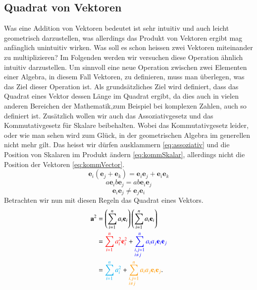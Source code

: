 \subsection{Quadrat von Vektoren}
Was eine Addition von Vektoren bedeutet ist sehr intuitiv und auch leicht geometrisch darzustellen, was allerdings das Produkt von Vektoren ergibt mag anfänglich unintuitiv wirken. 
Was soll es schon heissen zwei Vektoren miteinander zu multiplizieren? 
\newline
Im Folgenden werden wir versuchen diese Operation ähnlich intuitiv darzustellen.
\newline
Um sinnvoll eine neue Operation zwischen zwei Elementen einer Algebra, in diesem Fall Vektoren, zu definieren, muss man überlegen, was das Ziel dieser Operation ist. 
Als grundsätzliches Ziel wird definiert, dass das Quadrat eines Vektor dessen Länge im Quadrat ergibt, da dies auch in vielen anderen Bereichen der Mathematik,zum Beispiel bei komplexen Zahlen, auch so definiert ist.  
\newline 
Zusätzlich wollen wir auch das Assoziativgesetz und das Kommutativgesetz für Skalare beibehalten. Wobei das Kommutativgesetz leider, oder wie man sehen wird zum Glück, in der geometrischen Algebra im generellen nicht mehr gilt. Das heisst wir dürfen ausklammern \ref{eq:assoziativ} und die Position von Skalaren im Produkt ändern \ref{eq:kommSkalar}, allerdings nicht die Position der Vektoren \ref{eq:kommVector}.
\begin{equation}
    \label{eq:assoziativ}
    \textbf{e}_i(\textbf{e}_j + \textbf{e}_k) 
    = 
    \textbf{e}_i\textbf{e}_j + \textbf{e}_i\textbf{e}_k 
\end{equation}
\begin{equation}
    \label{eq:kommSkalar}
    a\textbf{e}_ib\textbf{e}_j 
    = 
    ab\textbf{e}_i\textbf{e}_j
\end{equation}
\begin{equation}
    \label{eq:kommVector}
    \textbf{e}_i\textbf{e}_j 
    \neq 
    \textbf{e}_j\textbf{e}_i
\end{equation}
Betrachten wir nun mit diesen Regeln das Quadrat eines Vektors.
\begin{align}
    \textbf{a}^2 &= 
    \left ( 
    \sum_{i=1}^{n} a_i \textbf{e}_i 
    \right ) 
    \left ( 
    \sum_{i=1}^{n} a_i \textbf{e}_i 
    \right )
    \label{eq:quad_a_1}
    \\
    &= 
    \textcolor{red}{\sum_{i=1}^{n} a_i^2\textbf{e}_i^2} 
    + 
    \textcolor{blue}{\sum_{\begin{subarray}{l}i,j=1\\i \neq j\end{subarray}}^n  a_ia_j\textbf{e}_i\textbf{e}_j } 
    \label{eq:quad_a_2}
    \\
    &= \textcolor{cyan}{\sum_{i=1}^{n} a_i^2} + \textcolor{orange}{\sum_{\begin{subarray}{l}i,j=1\\i \neq j\end{subarray}}^n  a_ia_j\textbf{e}_i\textbf{e}_j}.
    \label{eq:quad_a_3}
\end{align}

